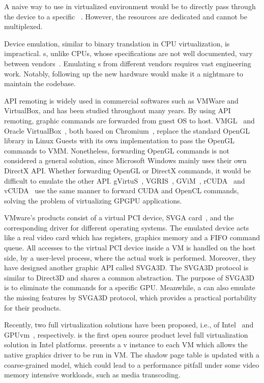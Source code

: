 A naive way to use \gpu{} in virtualized environment would be to directly pass through the device to a specific \vm{}~{\cite{hiremane2007intel, dong2009towards}}. However, the \gpu{} resources are dedicated and cannot be multiplexed.

Device emulation, similar to binary translation in CPU virtualization, is impractical. \gpu{}s, unlike CPUs, whose specifications are not well documented, vary between vendors~{\cite{dowty2009gpu}}. Emulating \gpu{}s from different vendors requires vast engineering work. Notably, following up the new \gpu{} hardware would make it a nightmare to maintain the codebase.

API remoting is widely used in commercial softwares such as VMWare and VirtualBox, and has been studied throughout many years. By using API remoting, graphic commands are forwarded from guest OS to host. VMGL~{\cite{lagar2007vmm}} and Oracle VirtualBox~{\cite{website:vbox}}, both based on Chromium~{\cite{humphreys2002chromium}}, replace the standard OpenGL library in Linux Guests with its own implementation to pass the OpenGL commands to VMM. Nonetheless, forwarding OpenGL commands is not considered a general solution, since Microsoft Windows mainly uses their own DirectX API. Whether forwarding OpenGL or DirectX commands, it would be difficult to emulate the other API.
gVirtuS~{\cite{giunta2010gpgpu}}, VGRIS~{\cite{qi2014vgris}}, GViM~{\cite{gupta2009gvim}}, rCUDA~{\cite{duato2010rcuda}} and vCUDA~{\cite{shi2012vcuda}} use the same manner to forward CUDA and OpenCL commands, solving the problem of virtualizing GPGPU applications.

VMware's products consist of a virtual PCI device, SVGA  card~{\cite{dowty2009gpu}}, and the corresponding driver for different operating systems. The emulated device acts like a real video card which has registers, graphics memory and a FIFO command queue. All accesses to the virtual PCI device inside a VM is handled on the host side, by a user-level process, where the actual work is performed. Moreover, they have designed another graphic API called SVGA3D. The SVGA3D protocol is similar to Direct3D and shares a common abstraction. The purpose of SVGA3D is to eliminate the commands for a specific GPU. Meanwhile, a \gpu{} can also emulate the missing features by SVGA3D protocol, which provides a practical portability for their products.

Recently, two full \gpu{} virtualization solutions have been proposed, i.e., \gvirt{} of Intel~{\cite{tian2014full}} and GPUvm~{\cite{suzuki2014gpuvm}}, respectively. \gvirt{} is the first open source product level full \gpu{} virtualization solution in Intel platforms. \gvirt{} presents a v\gpu{} instance to each VM which allows the native graphics driver to be run in VM. The shadow page table is updated with a coarse-grained model, which could lead to a performance pitfall under some video memory intensive workloads, such as media transcoding.

